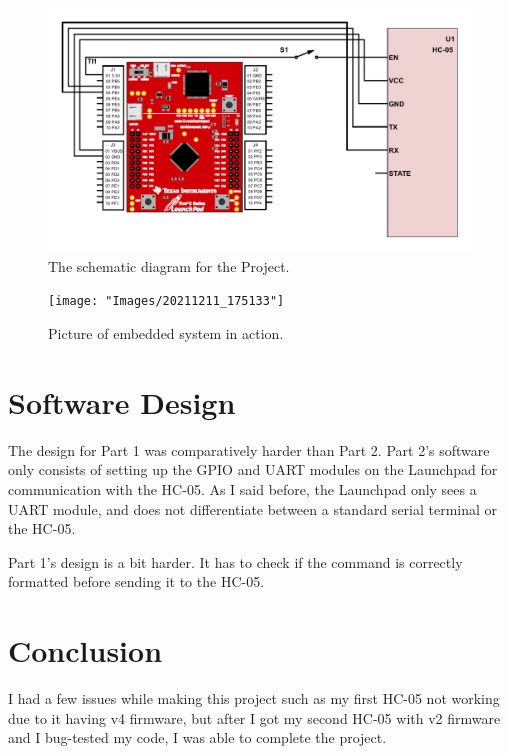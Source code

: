 \documentclass{article}
\begin{document}
\begin{figure}[H]
	\centering
	\includegraphics[width=\textwidth]{Images/schemeit-project}
	\caption{The schematic diagram for the Project.}
	\label{schematic}
\end{figure}

\begin{figure}[H]
	\centering
	\texttt{[image: "Images/20211211\_175133"]}
	\caption{Picture of embedded system in action.}
	\label{pic}
\end{figure}

\section{Software Design}
The design for Part 1 was comparatively harder than Part 2.
Part 2's software only consists of setting up the GPIO and
UART modules on the Launchpad for communication with
the HC-05. As I said before, the Launchpad only sees a
UART module, and does not differentiate between a standard
serial terminal or the HC-05.

Part 1's design is a bit harder. It has to check if the
command is correctly formatted before sending it to
the HC-05.

\section{Conclusion}
I had a few issues while making this project such as
my first HC-05 not working due to it having v4 firmware,
but after I got my second HC-05 with v2 firmware and I
bug-tested my code, I was able to complete the project.
\end{document}
